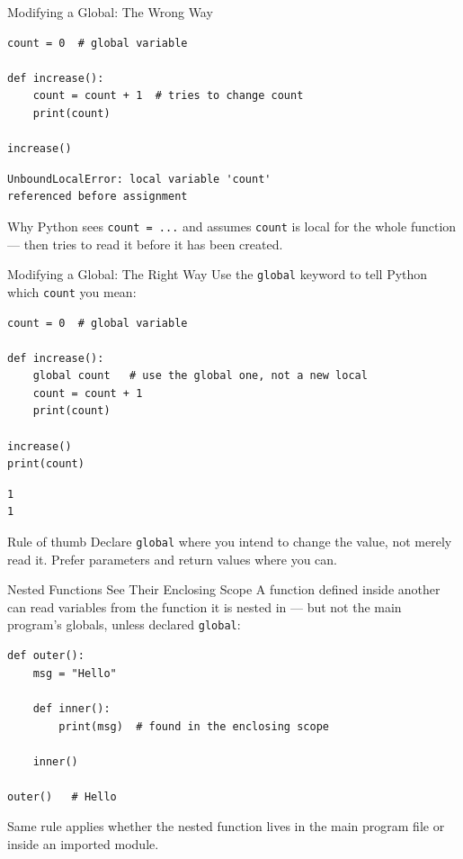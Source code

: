 \documentclass[9pt,aspectratio=169,xcolor=table]{beamer}
\begin{document}
\begin{frame}[fragile]{Modifying a Global: The Wrong Way}
    \leavevmode
\begin{lstlisting}
count = 0  # global variable

def increase():
    count = count + 1  # tries to change count
    print(count)

increase()
\end{lstlisting}
\begin{lstlisting}[style=skoutput]
UnboundLocalError: local variable 'count'
referenced before assignment
\end{lstlisting}

    \vspace{1mm}
    \begin{alertblock}{Why}
        Python sees \texttt{count = ...} and assumes \texttt{count} is
        local for the \alert{whole} function --- then tries to read it
        before it has been created.
    \end{alertblock}
\end{frame}

\begin{frame}[fragile]{Modifying a Global: The Right Way}
    \leavevmode
    Use the \texttt{global} keyword to tell Python which \texttt{count}
    you mean:

\begin{lstlisting}
count = 0  # global variable

def increase():
    global count   # use the global one, not a new local
    count = count + 1
    print(count)

increase()
print(count)
\end{lstlisting}
\begin{lstlisting}[style=skoutput]
1
1
\end{lstlisting}

    \vspace{1mm}
    \begin{alertblock}{Rule of thumb}
        Declare \texttt{global} where you intend to \alert{change} the
        value, not merely read it. Prefer parameters and return values
        where you can.
    \end{alertblock}
\end{frame}

\begin{frame}[fragile]{Nested Functions See Their Enclosing Scope}
    \leavevmode
    A function defined inside another can \alert{read} variables from
    the function it is nested in --- but not the main program's globals,
    unless declared \texttt{global}:

\begin{lstlisting}
def outer():
    msg = "Hello"

    def inner():
        print(msg)  # found in the enclosing scope

    inner()

outer()   # Hello
\end{lstlisting}

    \vspace{1mm}
    {\small Same rule applies whether the nested function lives in the
    main program file or inside an imported module.}
\end{frame}
\end{document}
